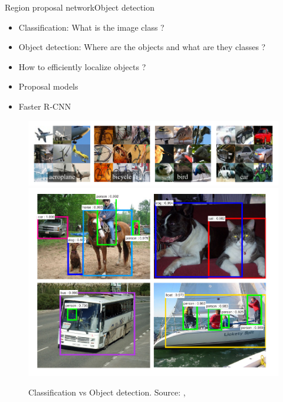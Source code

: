 \documentclass[8pt,t,aspectratio=1610]{beamer}
\newcommand{\ratio}{0.5}
\begin{document}
\begin{frame}{Region proposal network}{Object detection}
\begin{itemize}
    \item Classification: What is the image class ?
    \pause
    \item Object detection: Where are the objects and what are they classes ?
    \pause
    \item How to efficiently localize objects ?
    \item Proposal models \cite{hosang2016what}
    \item Faster R-CNN \cite{ren2015faster}
\end{itemize}
\begin{figure}
    \includegraphics[width=\ratio\linewidth, trim=0 0 340 0, clip]{rcnn_images.png}
    \includegraphics[width=\ratio\linewidth]{faster_rnn_rpn_imageoutputs.png}
    \caption{Classification vs Object detection. Source: \cite{girshick2014rich},  \cite{ren2015faster}}
\end{figure}

\end{frame}
\end{document}
